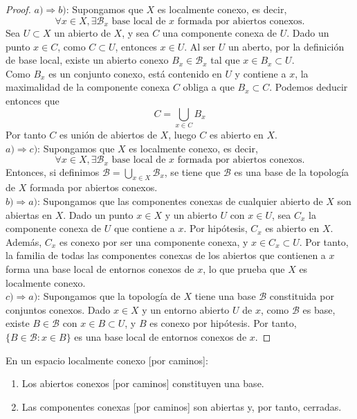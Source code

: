 \begin{proof}
    $a) \Rightarrow b)$: Supongamos que $X$ es localmente conexo, es decir, 
    $$\forall x \in X, \exists \mathcal{B}_x \text{ base local de } x \text{ formada por abiertos conexos}.$$
    Sea $U \subset X$ un abierto de $X$, y sea $C$ una componente conexa de $U$. Dado un punto $x \in C$, como $C \subset U$, entonces $x \in U$. Al ser $U$ un aberto, por la definición de base local, existe un abierto conexo $B_x \in \mathcal{B}_x$ tal que $x \in B_x \subset U$. \\
    Como $B_x$ es un conjunto conexo, está contenido en $U$ y contiene a $x$, la maximalidad de la componente conexa $C$ obliga a que $B_x \subset C$. Podemos deducir entonces que
    $$C = \bigcup_{x \in C} B_x$$
    Por tanto $C$ es unión de abiertos de $X$, luego $C$ es abierto en $X$.\\
    $a) \Rightarrow c)$: Supongamos que $X$ es localmente conexo, es decir,
    $$\forall x \in X, \exists \mathcal{B}_x \text{ base local de } x \text{ formada por abiertos conexos}.$$
    Entonces, si definimos $\mathcal{B} = \bigcup_{x \in X} \mathcal{B}_x$, se tiene que $\mathcal{B}$ es una base de la topología de $X$ formada por abiertos conexos.\\
    $b) \Rightarrow a)$: Supongamos que las componentes conexas de cualquier abierto de $X$ son abiertas en $X$. Dado un punto $x \in X$ y un abierto $U$ con $x \in U$, sea $C_x$ la componente conexa de $U$ que contiene a $x$. Por hipótesis, $C_x$ es abierto en $X$. Además, $C_x$ es conexo por ser una componente conexa, y $x \in C_x \subset U$. Por tanto, la familia de todas las componentes conexas de los abiertos que contienen a $x$ forma una base local de entornos conexos de $x$, lo que prueba que $X$ es localmente conexo.\\
    $c) \Rightarrow a)$: Supongamos que la topología de $X$ tiene una base $\mathcal{B}$ constituida por conjuntos conexos. Dado $x \in X$ y un entorno abierto $U$ de $x$, como $\mathcal{B}$ es base, existe $B \in \mathcal{B}$ con $x \in B \subset U$, y $B$ es conexo por hipótesis. Por tanto, $\{B \in \mathcal{B} : x \in B\}$ es una base local de entornos conexos de $x$.
\end{proof}
\begin{corolario}
    En un espacio localmente conexo [por caminos]:
    \begin{enumerate}[label=\alph*)]
        \item Los abiertos conexos [por caminos] constituyen una base.
        \item Las componentes conexas [por caminos] son abiertas y, por tanto, cerradas.
    \end{enumerate}
\end{corolario}
